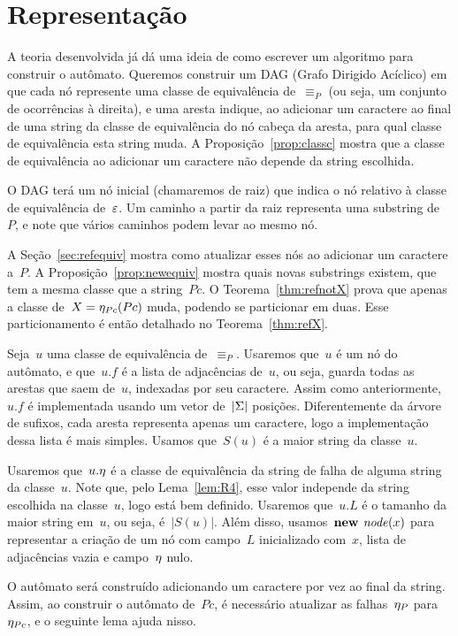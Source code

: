 \section{Representação}

A teoria desenvolvida já dá uma ideia de como escrever um algoritmo para construir o autômato. Queremos construir um DAG (Grafo Dirigido Acíclico) em que cada nó represente uma classe de equivalência de~$\equiv_P$ (ou seja, um conjunto de ocorrências à direita), e uma aresta indique, ao adicionar um caractere ao final de uma string da classe de equivalência do nó cabeça da aresta, para qual classe de equivalência esta string muda. A Proposição~\ref{prop:classc} mostra que a classe de equivalência ao adicionar um caractere não depende da string escolhida.

O DAG terá um nó inicial (chamaremos de raiz) que indica o nó relativo à classe de equivalência de~$\varepsilon$. Um caminho a partir da raiz representa uma substring de~$P$, e note que vários caminhos podem levar ao mesmo nó.

A Seção~\ref{sec:refequiv} mostra como atualizar esses nós ao adicionar um caractere a~$P$. A Proposição~\ref{prop:newequiv} mostra quais novas substrings existem, que tem a mesma classe que a string~$Pc$. O Teorema~\ref{thm:refnotX} prova que apenas a classe de~${X = \eta_{Pc}(Pc)}$ muda, podendo se particionar em duas. Esse particionamento é então detalhado no Teorema~\ref{thm:refX}.

Seja~$u$ uma classe de equivalência de~$\equiv_P$. Usaremos que~$u$ é um nó do autômato, e que~$u.f$ é a lista de adjacências de~$u$, ou seja, guarda todas as arestas que saem de~$u$, indexadas por seu caractere. Assim como anteriormente,~$u.f$ é implementada usando um vetor de~$|\Sigma|$ posições. Diferentemente da árvore de sufixos, cada aresta representa apenas um caractere, logo a implementação dessa lista é mais simples. Usamos que~$S(u)$ é a maior string da classe~$u$.

Usaremos que~$u.\eta$ é a classe de equivalência da string de falha de alguma string da classe~$u$. Note que, pelo Lema~\ref{lem:R4}, esse valor independe da string escolhida na classe~$u$, logo está bem definido. Usaremos que~$u.L$ é o tamanho da maior string em~$u$, ou seja, é~$|S(u)|$. Além disso, usamos~$\textbf{new } \mathit{node}(x)$ para representar a criação de um nó com campo~$L$ inicializado com~$x$, lista de adjacências vazia e campo~$\eta$ nulo.

O autômato será construído adicionando um caractere por vez ao final da string. Assim, ao construir o autômato de~$Pc$, é necessário atualizar as falhas~$\eta_P$ para~$\eta_{Pc}$, e o seguinte lema ajuda nisso.

